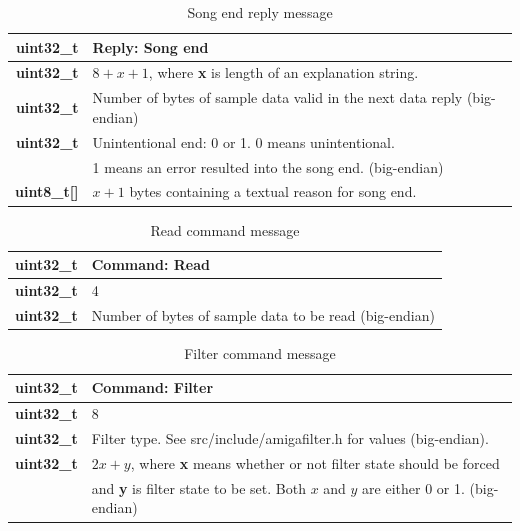 \documentclass{article}
\begin{document}
\begin{table}
\begin{center}
\caption{Song end reply message}
\label{tab:reply_song_end}
\begin{tabular}{|r|l|}
\hline
\textbf{uint32\_t} & Reply: Song end\\
\hline
\textbf{uint32\_t} & $8 + x + 1$, where \textbf{x} is length of an explanation string.\\
\hline
\textbf{uint32\_t} & Number of bytes of sample data valid in the next data reply (big-endian)\\
\hline
\textbf{uint32\_t} & Unintentional end: 0 or 1. 0 means unintentional.\\
 & 1 means an error resulted into the song end. (big-endian)\\
\hline
\textbf{uint8\_t[]} & $x + 1$ bytes containing a textual reason for song end.\\
\hline
\end{tabular}
\end{center}
\end{table}

\begin{table}
\begin{center}
\caption{Read command message}
\label{tab:command_read}
\begin{tabular}{|r|l|}
\hline
\textbf{uint32\_t} & Command: Read\\
\hline
\textbf{uint32\_t} & 4\\
\hline
\textbf{uint32\_t} & Number of bytes of sample data to be read (big-endian)\\
\hline
\end{tabular}
\end{center}
\end{table}

\begin{table}
\begin{center}
\caption{Filter command message}
\label{tab:command_filter}
\begin{tabular}{|r|l|}
\hline
\textbf{uint32\_t} & Command: Filter\\
\hline
\textbf{uint32\_t} & 8\\
\hline
\textbf{uint32\_t} & Filter type. See \mbox{src/include/amigafilter.h} for values (big-endian).\\
\hline
\textbf{uint32\_t} & $2x+y$, where \textbf{x} means whether or not filter state should be forced\\
 & and \textbf{y} is filter state to be set. Both $x$ and $y$ are either 0 or 1. (big-endian)\\
\hline
\end{tabular}
\end{center}
\end{table}
\end{document}

